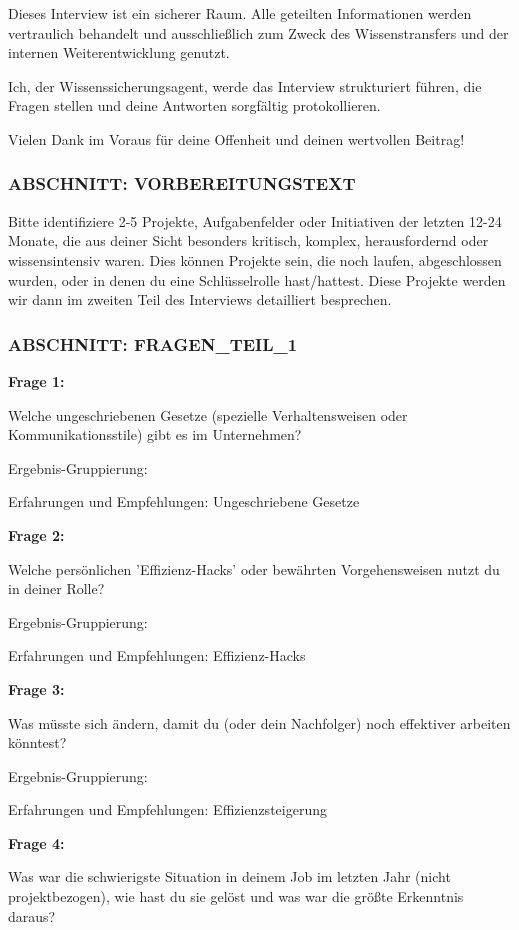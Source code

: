 \documentclass[
  10pt,
  ngerman,
  a4paper,
  toc=graduated,
  numbers=noenddot,
  headings=standardclasses,
  nonumberlist
]{scrartcl}
\begin{document}
Dieses Interview ist ein sicherer Raum. Alle geteilten Informationen werden vertraulich behandelt und ausschließlich zum Zweck des Wissenstransfers und der internen Weiterentwicklung genutzt.

Ich, der Wissenssicherungsagent, werde das Interview strukturiert führen, die Fragen stellen und deine Antworten sorgfältig protokollieren.

Vielen Dank im Voraus für deine Offenheit und deinen wertvollen Beitrag!

\subsubsection*{ABSCHNITT: VORBEREITUNGSTEXT}

Bitte identifiziere 2-5 Projekte, Aufgabenfelder oder Initiativen der letzten 12-24 Monate, die aus deiner Sicht besonders kritisch, komplex, herausfordernd oder wissensintensiv waren. Dies können Projekte sein, die noch laufen, abgeschlossen wurden, oder in denen du eine Schlüsselrolle hast/hattest. Diese Projekte werden wir dann im zweiten Teil des Interviews detailliert besprechen.

\subsubsection*{ABSCHNITT: FRAGEN\_TEIL\_1}

\textbf{Frage 1:}

Welche ungeschriebenen Gesetze (spezielle Verhaltensweisen oder Kommunikationsstile) gibt es im Unternehmen?

Ergebnis-Gruppierung:

Erfahrungen und Empfehlungen: Ungeschriebene Gesetze

\textbf{Frage 2:}

Welche persönlichen 'Effizienz-Hacks' oder bewährten Vorgehensweisen nutzt du in deiner Rolle?

Ergebnis-Gruppierung:

Erfahrungen und Empfehlungen: Effizienz-Hacks

\textbf{Frage 3:}

Was müsste sich ändern, damit du (oder dein Nachfolger) noch effektiver arbeiten könntest?

Ergebnis-Gruppierung:

Erfahrungen und Empfehlungen: Effizienzsteigerung

\textbf{Frage 4:}

Was war die schwierigste Situation in deinem Job im letzten Jahr (nicht projektbezogen), wie hast du sie gelöst und was war die größte Erkenntnis daraus?
\end{document}
